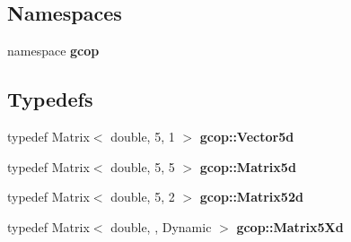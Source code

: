 \subsection*{\-Namespaces}
\begin{DoxyCompactItemize}
\item 
namespace {\bf gcop}
\end{DoxyCompactItemize}
\subsection*{\-Typedefs}
\begin{DoxyCompactItemize}
\item 
typedef \-Matrix$<$ double, 5, 1 $>$ {\bf gcop\-::\-Vector5d}
\item 
typedef \-Matrix$<$ double, 5, 5 $>$ {\bf gcop\-::\-Matrix5d}
\item 
typedef \-Matrix$<$ double, 5, 2 $>$ {\bf gcop\-::\-Matrix52d}
\item 
typedef \-Matrix$<$ double, , \-Dynamic $>$ {\bf gcop\-::\-Matrix5\-Xd}
\end{DoxyCompactItemize}
